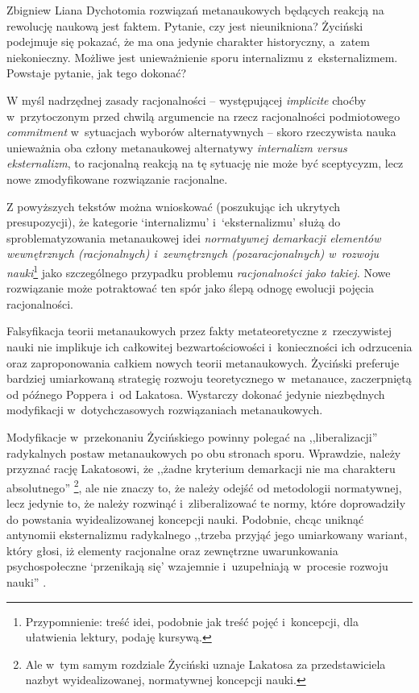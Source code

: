 \begin{artplenv}{Zbigniew Liana}
Dychotomia rozwiązań metanaukowych będących reakcją na rewolucję naukową jest faktem. Pytanie, czy jest nieunikniona?
Życiński podejmuje się pokazać, że ma ona jedynie charakter historyczny, a~zatem niekonieczny. Możliwe jest
unieważnienie sporu internalizmu z~eksternalizmem. Powstaje pytanie, jak tego dokonać?

W myśl nadrzędnej zasady racjonalności -- występującej \textit{implicite} choćby w~przytoczonym przed chwilą argumencie na
rzecz racjonalności podmiotowego \textit{commitment} w~sytuacjach wyborów alternatywnych -- skoro rzeczywista nauka
unieważnia oba człony metanaukowej alternatywy \textit{internalizm versus eksternalizm}, to racjonalną reakcją na tę
sytuację nie może być sceptycyzm, lecz nowe zmodyfikowane rozwiązanie racjonalne.

Z powyższych tekstów można wnioskować (poszukując ich ukrytych presupozycji), że kategorie
`internalizmu' i~`eksternalizmu' służą do sproblematyzowania metanaukowej idei \textit{normatywnej demarkacji
elementów wewnętrznych
(racjonalnych) i~zewnętrznych (pozaracjonalnych) w~rozwoju nauki}\footnote{Przypomnienie: treść idei, podobnie jak
treść pojęć i~koncepcji, dla ułatwienia lektury, podaję kursywą.} jako szczególnego przypadku problemu
\textit{racjonalności jako takiej. }Nowe rozwiązanie może potraktować ten spór jako ślepą odnogę ewolucji pojęcia
racjonalności.

Falsyfikacja teorii metanaukowych przez fakty metateoretyczne z~rzeczywistej nauki nie implikuje ich całkowitej
bezwartościowości i~konieczności ich odrzucenia oraz zaproponowania całkiem nowych teorii metanaukowych. Życiński
preferuje bardziej umiarkowaną strategię rozwoju teoretycznego w~metanauce, zaczerpniętą od późnego Poppera i~od
Lakatosa. Wystarczy dokonać jedynie niezbędnych modyfikacji w~dotychczasowych rozwiązaniach metanaukowych. 

Modyfikacje w~przekonaniu Życińskiego powinny polegać na ,,liberalizacji'' radykalnych postaw metanaukowych po obu
stronach sporu. Wprawdzie, należy przyznać rację Lakatosowi, że ,,żadne kryterium demarkacji nie ma charakteru
absolutnego''
\parencite[s.~230]{zycinski_elementy_1996}\footnote{Ale w~tym samym rozdziale
\parencite*[s.~244]{zycinski_elementy_1996}
Życiński uznaje Lakatosa za przedstawiciela nazbyt
wyidealizowanej, normatywnej koncepcji nauki.}, ale nie znaczy to, że należy odejść od metodologii normatywnej, lecz
jedynie to, że należy rozwinąć i~zliberalizować te normy, które doprowadziły do powstania wyidealizowanej koncepcji
nauki. Podobnie, chcąc uniknąć antynomii eksternalizmu radykalnego ,,trzeba przyjąć jego umiarkowany wariant, który
głosi, iż elementy racjonalne oraz zewnętrzne uwarunkowania psychospołeczne `przenikają się'
wzajemnie i~uzupełniają w~procesie rozwoju nauki''
\parencite[s.~156]{zycinski_elementy_1996}.


\end{artplenv}
